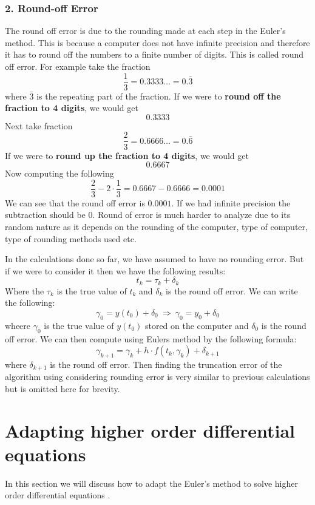 \documentclass[11pt,a4paper]{amsart}
\begin{document}
\subsubsection*{2. Round-off Error}
The round off error is due to the rounding made at each step in the Euler's method. This is because a computer does not have infinite precision and therefore it has to round off the numbers to a finite number of digits. This is called round off error. For example take the fraction \cite{buchanan, polking}
$$\frac{1}{3} = 0.3333\ldots = 0.\bar{3}$$
where $\bar{3}$ is the repeating part of the fraction. If we were to \textbf{round off the fraction to 4 digits}, we would get
$$0.3333$$
Next take fraction
$$\frac{2}{3} = 0.6666\ldots = 0.\bar{6}$$
If we were to \textbf{round up the fraction to 4 digits}, we would get
$$0.6667$$
Now computing the following 
$$\frac{2}{3} - 2 \cdot \frac{1}{3}  = 0.6667 - 0.6666 = 0.0001$$
We can see that the round off error is $0.0001$.
If we had infinite precision the subtraction should be $0$. Round of error is much harder to analyze due to its random nature as it depends on the rounding of the computer, type of computer, type of rounding methods used etc.

In the calculations done so far, we have assumed to have no rounding error. But if we were to consider it then we have the following results\cite{buchanan}:
$$t_k = \tau_k + \delta_k$$
Where the $\tau_k$ is the true value of $t_k$ and $\delta_k$ is the round off error. We can write the following:
$$\gamma_0 = y(t_0) + \delta_0 \ \Rightarrow \ \gamma_0 = y_0 + \delta_0$$
wheere $\gamma_0$ is the true value of $y(t_0)$ stored on the computer and $\delta_0$ is the round off error. We can then compute using Eulers method by the following formula:
$$\gamma_{k+1} = \gamma_k + h\cdot f(t_k, \gamma_k) + \delta_{k+1}$$
where $\delta_{k+1}$ is the round off error. Then finding the truncation error of the algorithm using considering rounding error is very similar to previous calculations but is omitted here for brevity.

\section{Adapting higher order differential equations}
In this section we will discuss how to adapt the Euler's method to solve higher order differential equations \cite{buchanan, atkinson, gerald}. 
\end{document}
